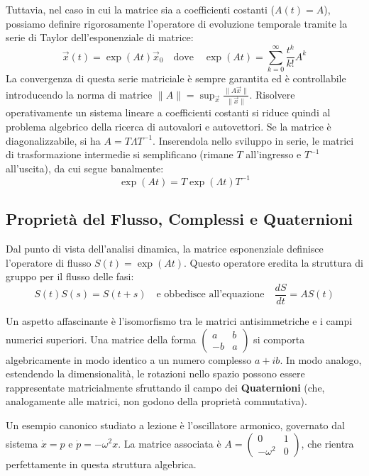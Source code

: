 \documentclass[12pt,a4paper]{article}
\begin{document}
Tuttavia, nel caso in cui la matrice sia a coefficienti costanti ($A(t) = A$), possiamo definire rigorosamente l'operatore di evoluzione temporale tramite la serie di Taylor dell'esponenziale di matrice:
\begin{equation}
\vec{x}(t) = \exp(A t)\vec{x}_0 \quad \text{dove} \quad \exp(At) = \sum_{k=0}^{\infty} \frac{t^k}{k!} A^k
\end{equation}
La convergenza di questa serie matriciale è sempre garantita ed è controllabile introducendo la norma di matrice $\|A\| = \sup_{\vec{x}} \frac{\|A\vec{x}\|}{\|\vec{x}\|}$. 
Risolvere operativamente un sistema lineare a coefficienti costanti si riduce quindi al problema algebrico della ricerca di autovalori e autovettori. Se la matrice è diagonalizzabile, si ha $A = T\Lambda T^{-1}$. Inserendola nello sviluppo in serie, le matrici di trasformazione intermedie si semplificano (rimane $T$ all'ingresso e $T^{-1}$ all'uscita), da cui segue banalmente:
\begin{equation}
\exp(At) = T \exp(\Lambda t) T^{-1}
\end{equation}

\subsection{Proprietà del Flusso, Complessi e Quaternioni}
Dal punto di vista dell'analisi dinamica, la matrice esponenziale definisce l'operatore di flusso $S(t) = \exp(At)$. Questo operatore eredita la struttura di gruppo per il flusso delle fasi:
\begin{equation}
S(t)S(s) = S(t+s) \quad \text{e obbedisce all'equazione} \quad \frac{dS}{dt} = A S(t)
\end{equation}

Un aspetto affascinante è l'isomorfismo tra le matrici antisimmetriche e i campi numerici superiori. Una matrice della forma $\begin{pmatrix} a & b \\ -b & a \end{pmatrix}$ si comporta algebricamente in modo identico a un numero complesso $a+ib$. In modo analogo, estendendo la dimensionalità, le rotazioni nello spazio possono essere rappresentate matricialmente sfruttando il campo dei \textbf{Quaternioni} (che, analogamente alle matrici, non godono della proprietà commutativa).

Un esempio canonico studiato a lezione è l'oscillatore armonico, governato dal sistema $\dot{x} = p$ e $\dot{p} = -\omega^2 x$. La matrice associata è $A = \begin{pmatrix} 0 & 1 \\ -\omega^2 & 0 \end{pmatrix}$, che rientra perfettamente in questa struttura algebrica.
\end{document}
